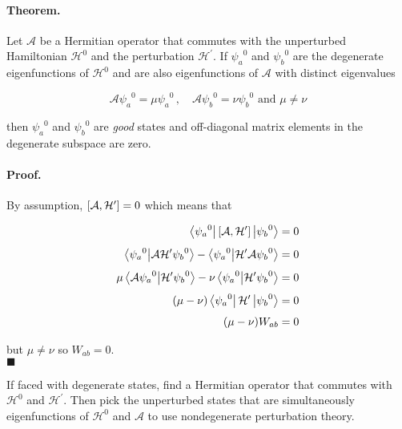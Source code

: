 \documentclass[12pt, titlepage]{article}
\begin{document}
\begin{mdframed}
\paragraph*{Theorem.} Let $\mathcal{A}$ be a Hermitian operator that commutes with the unperturbed Hamiltonian $\mathcal{H}^0$ and the perturbation $\mathcal{H}^\prime$. If ${\psi_a}^0$ and ${\psi_b}^0$ are the degenerate eigenfunctions of $\mathcal{H}^0$ and are also eigenfunctions of $\mathcal{A}$ with distinct eigenvalues

\begin{equation*}
	\mathcal{A}{\psi_a}^0 = \mu{\psi_a}^0 \,, \quad \mathcal{A}{\psi_b}^0 = \nu{\psi_b}^0 \,\,\text{and}\,\, \mu\neq\nu
\end{equation*}

then ${\psi_a}^0$ and ${\psi_b}^0$ are \textit{good} states and off-diagonal matrix elements in the degenerate subspace are zero.

\paragraph*{Proof.} By assumption, $\comm{\mathcal{A}}{\mathcal{H}^\prime} = 0$ which means that

\begin{align*}
	\bra{{\psi_a}^0}\comm{\mathcal{A}}{\mathcal{H}^\prime}\ket{{\psi_b}^0} &= 0 \\[4pt]
	\bra{{\psi_a}^0}\ket{\mathcal{A}\mathcal{H}^\prime{\psi_b}^0} - \bra{{\psi_a}^0}\ket{\mathcal{H}^\prime\mathcal{A}{\psi_b}^0} &= 0 \\[4pt]
		\mu\bra{\mathcal{A}{\psi_a}^0}\ket{\mathcal{H}^\prime{\psi_b}^0} - \nu\bra{{\psi_a}^0}\ket{\mathcal{H}^\prime{\psi_b}^0} &= 0 \\[4pt]
		(\mu-\nu)\bra{{\psi_a}^0}\mathcal{H}^\prime\ket{{\psi_b}^0} &= 0 \\[4pt]
		(\mu-\nu)W_{ab} &= 0
\end{align*}

but $\mu\neq\nu$ so $W_{ab} = 0$. \\
\hspace*{\fill}$\blacksquare$
\end{mdframed}

If faced with degenerate states, find a Hermitian operator that commutes with $\mathcal{H}^0$ and $\mathcal{H}^\prime$. Then pick the unperturbed states that are simultaneously eigenfunctions of $\mathcal{H}^0$ and $\mathcal{A}$ to use nondegenerate perturbation theory.
\end{document}
